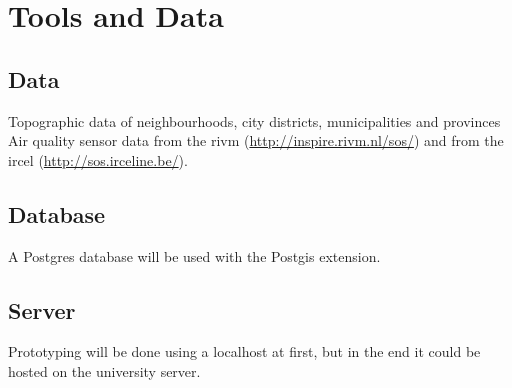 


\chapter{Tools and Data}
\label{chap:TD}

\section{Data}
Topographic data of neighbourhoods, city districts, municipalities and provinces\\

Air quality sensor data from the \ac{rivm} (\url{http://inspire.rivm.nl/sos/}) and from the \ac{ircel} (\url{http://sos.irceline.be/}). \\

\iffalse
The \ac{lustre} aims to "help users to easier and better express and use thesauri and controlled vocabularies for metadata work within Spatial Data Infrastructures" \cite[p. 137]{LD:LusTRE}. This ontology does not focus on sensor data, but does describe many environmental phenomenon that are being observed. This fits with the idea of \cite{SSW:Cox4} to use ontologies that are already available online for defining metadata elements of sensor data. Since the \ac{sos} from the \ac{RIVM} and the \ac{sos} from \ac{irceline} provides information on   
\fi

\section{Database}
A Postgres database will be used with the Postgis extension.

\section{Server}
Prototyping will be done using a localhost at first, but in the end it could be hosted on the university server.


